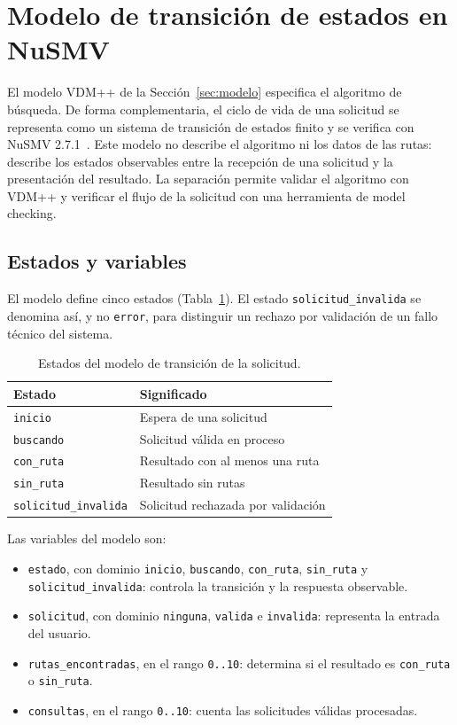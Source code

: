 \section{Modelo de transición de estados en NuSMV}
\label{sec:nusmv}

El modelo VDM++ de la Sección~\ref{sec:modelo} especifica el algoritmo de búsqueda. De forma complementaria, el ciclo de vida de una solicitud se representa como un sistema de transición de estados finito y se verifica con NuSMV 2.7.1~\cite{nusmv}. Este modelo no describe el algoritmo ni los datos de las rutas: describe los estados observables entre la recepción de una solicitud y la presentación del resultado. La separación permite validar el algoritmo con VDM++ y verificar el flujo de la solicitud con una herramienta de model checking.

\subsection{Estados y variables}
\label{sec:nusmv-estados}

El modelo define cinco estados (Tabla~\ref{tab:nusmv-estados}). El estado \texttt{solicitud\_invalida} se denomina así, y no \texttt{error}, para distinguir un rechazo por validación de un fallo técnico del sistema.

\begin{table}[!t]
\centering
\caption{Estados del modelo de transición de la solicitud.}
\label{tab:nusmv-estados}
\small
\begin{tabular}{|l|p{4.6cm}|}
\hline
Estado & Significado \\
\hline
\texttt{inicio} & Espera de una solicitud \\
\hline
\texttt{buscando} & Solicitud válida en proceso \\
\hline
\texttt{con\_ruta} & Resultado con al menos una ruta \\
\hline
\texttt{sin\_ruta} & Resultado sin rutas \\
\hline
\texttt{solicitud\_invalida} & Solicitud rechazada por validación \\
\hline
\end{tabular}
\end{table}

Las variables del modelo son:
\begin{itemize}
  \item \texttt{estado}, con dominio \texttt{inicio}, \texttt{buscando}, \texttt{con\_ruta}, \texttt{sin\_ruta} y \texttt{solicitud\_invalida}: controla la transición y la respuesta observable.
  \item \texttt{solicitud}, con dominio \texttt{ninguna}, \texttt{valida} e \texttt{invalida}: representa la entrada del usuario.
  \item \texttt{rutas\_encontradas}, en el rango \texttt{0..10}: determina si el resultado es \texttt{con\_ruta} o \texttt{sin\_ruta}.
  \item \texttt{consultas}, en el rango \texttt{0..10}: cuenta las solicitudes válidas procesadas.
\end{itemize}


